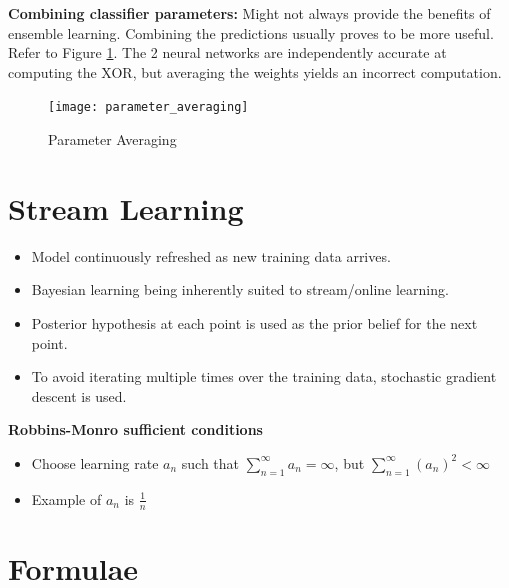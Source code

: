 \documentclass[parskip=half]{scrartcl}
\begin{document}
    \textbf{Combining classifier parameters: } Might not always provide the benefits of ensemble learning. Combining the predictions usually proves to be more useful. Refer to Figure \ref{fig:parameter_averaging}. The 2 neural networks are independently accurate at computing the XOR, but averaging the weights yields an incorrect computation.
    \begin{figure}[ht]
        \centering
        \texttt{[image: parameter\_averaging]}
        \caption{Parameter Averaging}
        \label{fig:parameter_averaging}
    \end{figure}



\newpage


\section{Stream Learning} %
\label{sec:stream_learning}

    \begin{itemize}
        \item 
        Model continuously refreshed as new training data arrives.
        \item 
        Bayesian learning being inherently suited to stream/online learning.
        \item 
        Posterior hypothesis at each point is used as the prior belief for the next point.
        \item 
        To avoid iterating multiple times over the training data, stochastic gradient descent is used.
    \end{itemize}

    \textbf{Robbins-Monro sufficient conditions}
    \begin{itemize}
        \item 
        Choose learning rate $a_n$ such that $\sum_{n=1}^{\infty} a_n = \infty$, but $\sum_{n=1}^{\infty} (a_n)^2 < \infty$
        \item 
        Example of $a_n$ is $\frac{1}{n} $
    \end{itemize}



\newpage


\section{Formulae} %
\label{sec:formulae}
\end{document}
